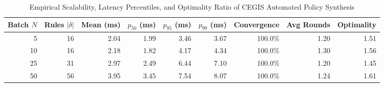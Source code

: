 \begin{table}[htbp]
\centering
\caption{Empirical Scalability, Latency Percentiles, and Optimality Ratio of CEGIS Automated Policy Synthesis}
\label{tab:cegis_synthesis_benchmarks}
\begin{tabular}{rrrrrrrrr}
\hline
\textbf{Batch $N$} & \textbf{Rules $|\delta|$} & \textbf{Mean (ms)} & \textbf{$p_{50}$ (ms)} & \textbf{$p_{95}$ (ms)} & \textbf{$p_{99}$ (ms)} & \textbf{Convergence} & \textbf{Avg Rounds} & \textbf{Optimality} \\
\hline
5 & 16 & 2.04 & 1.99 & 3.46 & 3.67 & 100.0\% & 1.20 & 1.51 \\
10 & 16 & 2.18 & 1.82 & 4.17 & 4.34 & 100.0\% & 1.30 & 1.56 \\
25 & 31 & 2.97 & 2.49 & 6.44 & 7.10 & 100.0\% & 1.20 & 1.45 \\
50 & 56 & 3.95 & 3.45 & 7.54 & 8.07 & 100.0\% & 1.24 & 1.61 \\
\hline
\end{tabular}
\end{table}